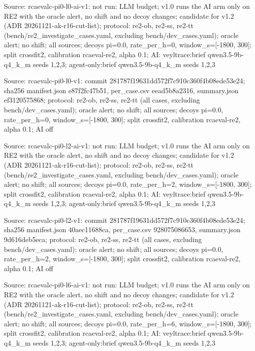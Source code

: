 \noindent Source: rcaevalc-pi0-l0-ai-v1: not run: LLM budget; v1.0 runs the AI arm only on RE2 with the oracle alert, no shift and no decoy changes; candidate for v1.2 (ADR 20261121-ak-r16-cut-list); protocol: re2-ob, re2-ss, re2-tt (bench/\allowbreak{}re2\_investigate\_cases.yaml, excluding bench/\allowbreak{}dev\_cases.yaml); oracle alert; no shift; all sources; decoys pi=0.0, rate\_per\_h=0, window\_s=[-1800, 300]; split crossfit2, calibration rcaeval-re2, alpha 0.1; AI: veyltrace:brief qwen3.5-9b-q4\_k\_m seeds 1,2,3; agent-only:brief qwen3.5-9b-q4\_k\_m seeds 1,2,3\par
\noindent Source: rcaevalc-pi0-l0-v1: commit 281787f19631dd572f7c910c360f4b08ede53e24; sha256 manifest.json e87f2fc47b51, per\_case.csv eead5b8a2316, summary.json ef3120575868; protocol: re2-ob, re2-ss, re2-tt (all cases, excluding bench/\allowbreak{}dev\_cases.yaml); oracle alert; no shift; all sources; decoys pi=0.0, rate\_per\_h=0, window\_s=[-1800, 300]; split crossfit2, calibration rcaeval-re2, alpha 0.1; AI off\par
\noindent Source: rcaevalc-pi0-l2-ai-v1: not run: LLM budget; v1.0 runs the AI arm only on RE2 with the oracle alert, no shift and no decoy changes; candidate for v1.2 (ADR 20261121-ak-r16-cut-list); protocol: re2-ob, re2-ss, re2-tt (bench/\allowbreak{}re2\_investigate\_cases.yaml, excluding bench/\allowbreak{}dev\_cases.yaml); oracle alert; no shift; all sources; decoys pi=0.0, rate\_per\_h=2, window\_s=[-1800, 300]; split crossfit2, calibration rcaeval-re2, alpha 0.1; AI: veyltrace:brief qwen3.5-9b-q4\_k\_m seeds 1,2,3; agent-only:brief qwen3.5-9b-q4\_k\_m seeds 1,2,3\par
\noindent Source: rcaevalc-pi0-l2-v1: commit 281787f19631dd572f7c910c360f4b08ede53e24; sha256 manifest.json 40aec11688ca, per\_case.csv 928075086653, summary.json 9d616deb5eca; protocol: re2-ob, re2-ss, re2-tt (all cases, excluding bench/\allowbreak{}dev\_cases.yaml); oracle alert; no shift; all sources; decoys pi=0.0, rate\_per\_h=2, window\_s=[-1800, 300]; split crossfit2, calibration rcaeval-re2, alpha 0.1; AI off\par
\noindent Source: rcaevalc-pi0-l6-ai-v1: not run: LLM budget; v1.0 runs the AI arm only on RE2 with the oracle alert, no shift and no decoy changes; candidate for v1.2 (ADR 20261121-ak-r16-cut-list); protocol: re2-ob, re2-ss, re2-tt (bench/\allowbreak{}re2\_investigate\_cases.yaml, excluding bench/\allowbreak{}dev\_cases.yaml); oracle alert; no shift; all sources; decoys pi=0.0, rate\_per\_h=6, window\_s=[-1800, 300]; split crossfit2, calibration rcaeval-re2, alpha 0.1; AI: veyltrace:brief qwen3.5-9b-q4\_k\_m seeds 1,2,3; agent-only:brief qwen3.5-9b-q4\_k\_m seeds 1,2,3\par
